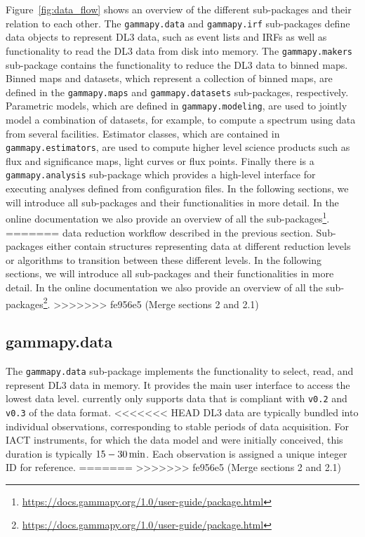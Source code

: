 \documentclass[longauth]{aa}
\newcommand{\code}[1]{\texttt{#1}}
\begin{document}
Figure~\ref{fig:data_flow} shows an overview of the different sub-packages and
their relation to each other. The \code{gammapy.data} and \code{gammapy.irf}
sub-packages define data objects to represent DL3 data, such as
event lists and IRFs as well as functionality
to read the DL3 data from disk into memory. The \code{gammapy.makers} sub-package
contains the functionality to reduce the DL3 data to binned maps.
Binned maps and datasets, which represent a collection of binned
maps, are defined in the \code{gammapy.maps} and \code{gammapy.datasets}
sub-packages, respectively. Parametric models, which are defined in
\code{gammapy.modeling}, are used to jointly model a combination
of datasets, for example, to compute a spectrum using data from several facilities. Estimator classes,
which are contained in \code{gammapy.estimators}, are used to
compute higher level science products such as flux and significance maps,
light curves or flux points. Finally there is a \code{gammapy.analysis}
sub-package which provides a high-level interface for executing analyses
defined from configuration files. In the following sections, we will
introduce all sub-packages and their functionalities in more detail.
In the online documentation we also provide an overview of all
the \gammapy sub-packages\footnote{\url{https://docs.gammapy.org/1.0/user-guide/package.html}}.
=======
data reduction workflow described in the previous section. Sub-packages either
contain structures representing data at different reduction levels or algorithms
to transition between these different levels. In the following sections, we will
introduce all sub-packages and their functionalities in more detail. In the online 
documentation we also provide an overview of all the \gammapy sub-packages\footnote{\url{https://docs.gammapy.org/1.0/user-guide/package.html}}.
>>>>>>> fe956e5 (Merge sections 2 and 2.1)


\subsection{gammapy.data}
\label{ssec:gammapy-data}
The \code{gammapy.data} sub-package implements the functionality to select,
read, and represent DL3 \gammaray data in memory. It provides the main user
interface to access the lowest data level. \gammapy currently only
supports data that is compliant with \code{v0.2} and \code{v0.3} of the \gadf data format.
<<<<<<< HEAD
DL3 data are typically bundled into individual observations, corresponding to
stable periods of data acquisition. For IACT instruments, for which the \gadf
data model and \gammapy were initially conceived, this duration is typically 
$15 - 30\,{\rm min}$. Each observation is assigned a unique integer ID for reference.
=======
>>>>>>> fe956e5 (Merge sections 2 and 2.1)
\end{document}

